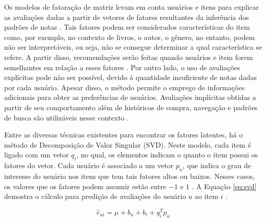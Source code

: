         Os modelos de fatoração de matriz levam em conta usuários e itens para explicar as avaliações dadas a partir de vetores de fatores resultantes da inferência dos padrões de notas \cite{Koren2009}. Tais fatores podem ser considerados características do item como, por exemplo, no contexto de livros, o autor, o gênero, no entanto, podem não ser interpretáveis, ou seja, não se consegue determinar a qual característica se refere. A partir disso, recomendações serão feitas quando usuários e item forem semelhantes em relação a esses fatores \cite{Jannach2010}. Por outro lado, o uso de avaliações explícitas pode não ser possível, devido à quantidade insuficiente de notas dadas por cada usuário. Apesar disso, o método permite o emprego de informações adicionais para obter as preferências de usuários. Avaliações implícitas obtidas a partir de seu comportamento além de históricos de compra, navegação e padrões de busca são utilizáveis nesse contexto \cite{Koren2009}. 
        
        
        
                
        Entre as diversas técnicas existentes para encontrar os fatores latentes, há o método de Decomposição de Valor Singular (SVD). Neste modelo, cada item é ligado com um vetor $q_i$, no qual, os elementos indicam o quanto o item possui os fatores do vetor. Cada usuário é associado a um vetor $p_u$, que indica o grau de interesse do usuário nos itens que tem tais fatores altos ou baixos. Nesses casos, os valores que os fatores podem assumir estão entre $-1$ e $1$ .  A Equação \ref{eq:svd} demostra o cálculo para predição de avaliações do usuário $u$ ao item $i$ \cite{Ricci2010}.
        
        \begin{equation}
            \hat{r}_{ui} = \mu +b_u +b_i + q^T_ip_u  \label{eq:svd}
        \end{equation}
        
